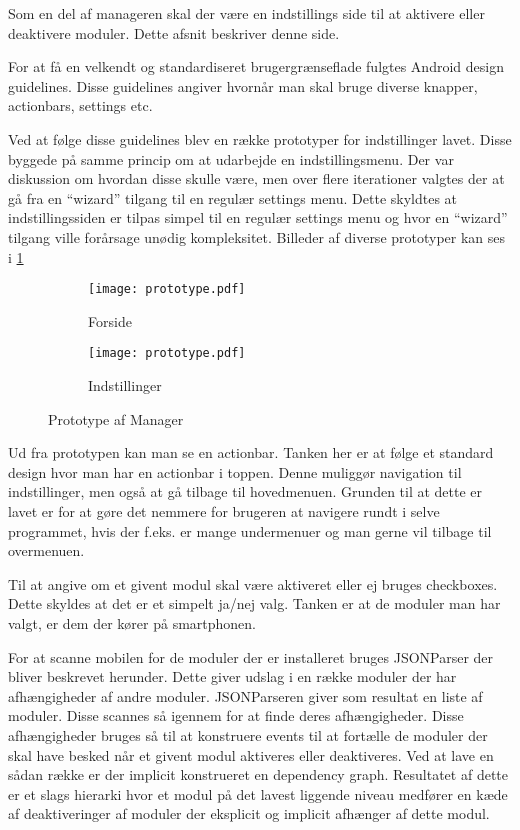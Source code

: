 Som en del af manageren skal der være en indstillings side til at aktivere eller deaktivere moduler. Dette afsnit beskriver denne side.

For at få en velkendt og standardiseret brugergrænseflade fulgtes Android design guidelines.
Disse guidelines angiver hvornår man skal bruge diverse knapper, actionbars, settings etc.
\citep{androiddesign}

Ved at følge disse guidelines blev en række prototyper for indstillinger lavet.
Disse byggede på samme princip om at udarbejde en indstillingsmenu.
Der var diskussion om hvordan disse skulle være, men over flere iterationer valgtes der at gå fra en ``wizard'' tilgang til en regulær settings menu.
Dette skyldtes at indstillingssiden er tilpas simpel til en regulær settings menu og hvor en ``wizard'' tilgang ville forårsage unødig kompleksitet.
Billeder af diverse prototyper kan ses i \cref{fig:prototype-manager}

\begin{figure}[!h]
	\centering
	\begin{subfigure}[b]{0.45\textwidth}
			\texttt{[image: prototype.pdf]}
			\caption{Forside}
	\end{subfigure}
	\begin{subfigure}[b]{0.45\textwidth}
			\texttt{[image: prototype.pdf]}
			\caption{Indstillinger}
	\end{subfigure}
	\caption{Prototype af Manager}
	\label{fig:prototype-manager}
\end{figure}


Ud fra prototypen kan man se en actionbar.
Tanken her er at følge et standard design hvor man har en actionbar i toppen.
Denne muliggør navigation til indstillinger, men også at gå tilbage til hovedmenuen.
Grunden til at dette er lavet er for at gøre det nemmere for brugeren at navigere rundt i selve programmet, hvis der f.eks. er mange undermenuer og man gerne vil tilbage til overmenuen.

Til at angive om et givent modul skal være aktiveret eller ej bruges checkboxes.
Dette skyldes at det er et simpelt ja/nej valg. 
Tanken er at de moduler man har valgt, er dem der kører på smartphonen.

For at scanne mobilen for de moduler der er installeret bruges JSONParser der bliver beskrevet herunder.
Dette giver udslag i en række moduler der har afhængigheder af andre moduler.
JSONParseren giver som resultat en liste af moduler. Disse scannes så igennem for at finde deres afhængigheder.
Disse afhængigheder bruges så til at konstruere events til at fortælle de moduler der skal have besked når et givent modul aktiveres eller deaktiveres.
Ved at lave en sådan række er der implicit konstrueret en dependency graph.
Resultatet af dette er et slags hierarki hvor et modul på det lavest liggende niveau medfører en kæde af deaktiveringer af moduler der eksplicit og implicit afhænger af dette modul.
